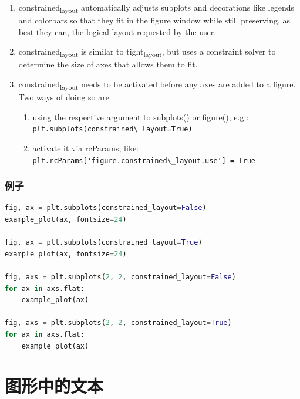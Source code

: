 \documentclass[UTF8,a4paper,12pt]{ctexart}  %
\providecommand{\tightlist}{\setlength{\itemsep}{0pt}\setlength{\parskip}{0pt}}
\newcommand{\passthrough}[1]{\lstset{mathescape=false}#1\lstset{mathescape=true}}
\begin{document}
\begin{enumerate}
\def\labelenumi{\arabic{enumi}.}
\tightlist
\item
  constrained\textsubscript{layout} automatically adjusts subplots and decorations
  like legends and colorbars so that they fit in the figure window
  while still preserving, as best they can, the logical layout
  requested by the user.
\item
  constrained\textsubscript{layout} is similar to tight\textsubscript{layout}, but uses a
  constraint solver to determine the size of axes that allows them to
  fit.
\item
  constrained\textsubscript{layout} needs to be activated before any axes are added
  to a figure. Two ways of doing so are

  \begin{enumerate}
  \def\labelenumii{\arabic{enumii}.}
  \tightlist
  \item
    using the respective argument to subplots() or figure(), e.g.:
    \passthrough{\lstinline!plt.subplots(constrained\_layout=True)!}
  \item
    activate it via rcParams, like:
    \passthrough{\lstinline!plt.rcParams['figure.constrained\_layout.use'] = True!}
  \end{enumerate}
\end{enumerate}

\hypertarget{ux4f8bux5b50-11}{%
\subsubsection{例子}\label{ux4f8bux5b50-11}}

\begin{lstlisting}[language=Python]
fig, ax = plt.subplots(constrained_layout=False)
example_plot(ax, fontsize=24)

fig, ax = plt.subplots(constrained_layout=True)
example_plot(ax, fontsize=24)

fig, axs = plt.subplots(2, 2, constrained_layout=False)
for ax in axs.flat:
    example_plot(ax)

fig, axs = plt.subplots(2, 2, constrained_layout=True)
for ax in axs.flat:
    example_plot(ax)
\end{lstlisting}

\hypertarget{ux56feux5f62ux4e2dux7684ux6587ux672c}{%
\section{图形中的文本}\label{ux56feux5f62ux4e2dux7684ux6587ux672c}}
\end{document}
